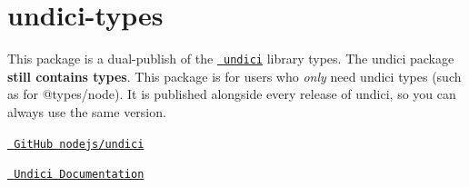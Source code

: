 \chapter{undici-\/types}
\hypertarget{md_Dashboard_2node__modules_2undici-types_2README}{}\label{md_Dashboard_2node__modules_2undici-types_2README}
\label{md_Dashboard_2node__modules_2undici-types_2README_autotoc_md3118}%
%
 This package is a dual-\/publish of the \href{https://www.npmjs.com/package/undici}{\texttt{ undici}} library types. The {\ttfamily undici} package {\bfseries{still contains types}}. This package is for users who {\itshape only} need undici types (such as for {\ttfamily @types/node}). It is published alongside every release of {\ttfamily undici}, so you can always use the same version.


\begin{DoxyItemize}
\item \href{https://github.com/nodejs/undici}{\texttt{ Git\+Hub nodejs/undici}}
\item \href{https://undici.nodejs.org/\#/}{\texttt{ Undici Documentation}} 
\end{DoxyItemize}